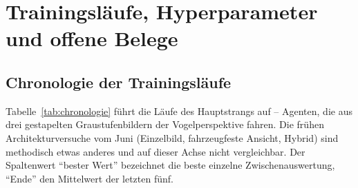 \chapter{Trainingsläufe, Hyperparameter und offene Belege}
\label{chap:anhang_b}

\section{Chronologie der Trainingsläufe}

Tabelle~\ref{tab:chronologie} führt die Läufe des Hauptstrangs auf -- Agenten, die aus drei gestapelten Graustufenbildern der Vogelperspektive fahren. Die frühen Architekturversuche vom Juni (Einzelbild, fahrzeugfeste Ansicht, Hybrid) sind methodisch etwas anderes und auf dieser Achse nicht vergleichbar. Der Spaltenwert \enquote{bester Wert} bezeichnet die beste einzelne Zwischenauswertung, \enquote{Ende} den Mittelwert der letzten fünf.

